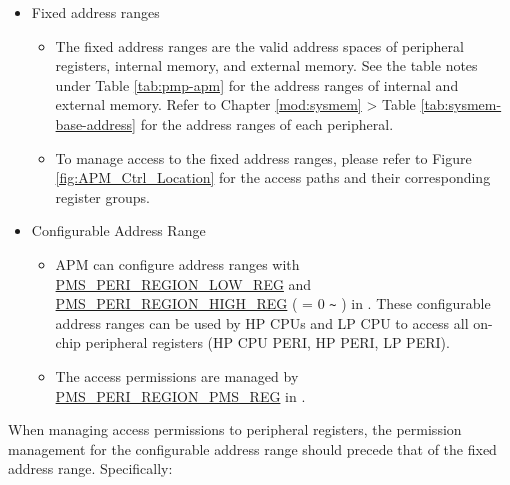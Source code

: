 \documentclass[main\_\_EN.tex]{subfiles}
\begin{document}
\begin{itemize}
    \item Fixed address ranges
    \begin{itemize}
        \item The fixed address ranges are the valid address spaces of peripheral registers, internal memory, and external memory. See the table notes under Table \ref{tab:pmp-apm} for the address ranges of internal and external memory. Refer to Chapter \ref{mod:sysmem} \textit{} > Table \ref{tab:sysmem-base-address} for the address ranges of each peripheral.
        \item To manage access to the fixed address ranges, please refer to Figure \ref{fig:APM_Ctrl_Location} for the access paths and their corresponding register groups.
    \end{itemize}
    \item Configurable Address Range
    \begin{itemize}
        \item APM can configure  address ranges with \hyperref[fielddesc:PMSPERIREGIONNLOW]{PMS\_PERI\_REGION\_LOW\_REG} and \hyperref[fielddesc:PMSPERIREGIONNHIGH]{PMS\_PERI\_REGION\_HIGH\_REG} ( = 0 \verb+~+ ) in . These configurable address ranges can be used by HP CPUs and LP CPU to access all on-chip peripheral registers (HP CPU PERI, HP PERI, LP PERI).
        \item The access permissions are managed by \hyperref[regdesc:PMSPERIREGIONPMSREG]{PMS\_PERI\_REGION\_PMS\_REG} in .
    \end{itemize}
\end{itemize}

When managing access permissions to peripheral registers, the permission management for the configurable address range should precede that of the fixed address range. Specifically:
\end{document}
